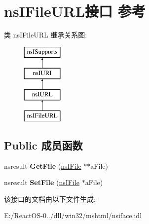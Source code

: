 \hypertarget{interfacens_i_file_u_r_l}{}\section{ns\+I\+File\+U\+R\+L接口 参考}
\label{interfacens_i_file_u_r_l}
类 ns\+I\+File\+U\+RL 继承关系图\+:\begin{figure}[H]
\begin{center}
\leavevmode
\includegraphics[height=4.000000cm]{interfacens_i_file_u_r_l}
\end{center}
\end{figure}
\subsection*{Public 成员函数}
\begin{DoxyCompactItemize}
\item 
\mbox{\label{interfacens_i_file_u_r_l_a2a32c33ef9f547ce56127416bb35097b}} 
nsresult {\bfseries Get\+File} (\hyperlink{interfacens_i_file}{ns\+I\+File} $\ast$$\ast$a\+File)
\item 
\mbox{\label{interfacens_i_file_u_r_l_a2570a649cfccaae570acbcb9d67afc77}} 
nsresult {\bfseries Set\+File} (\hyperlink{interfacens_i_file}{ns\+I\+File} $\ast$a\+File)
\end{DoxyCompactItemize}


该接口的文档由以下文件生成\+:\begin{DoxyCompactItemize}
\item 
E\+:/\+React\+O\+S-\/0../dll/win32/mshtml/nsiface.\+idl\end{DoxyCompactItemize}
